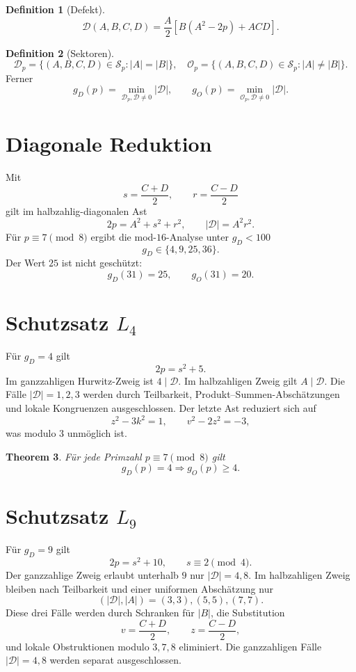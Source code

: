 \documentclass[11pt,a4paper]{article}
\newtheorem{theorem}{Theorem}[section]
\theoremstyle{definition}
\newtheorem{definition}[theorem]{Definition}
\newcommand{\Sp}{\mathcal S_p}
\newcommand{\Dp}{\mathcal D_p}
\newcommand{\Op}{\mathcal O_p}
\newcommand{\Def}{\mathscr D}
\begin{document}
\begin{definition}[Defekt]
\[
\Def(A,B,C,D)=\frac{A}{2}\left[B(A^2-2p)+ACD\right].
\]
\end{definition}

\begin{definition}[Sektoren]
\[
\Dp=\{(A,B,C,D)\in\Sp:|A|=|B|\},
\quad
\Op=\{(A,B,C,D)\in\Sp:|A|\ne|B|\}.
\]
Ferner
\[
g_D(p)=\min_{\Dp,\Def\ne0}|\Def|,
\qquad
g_O(p)=\min_{\Op,\Def\ne0}|\Def|.
\]
\end{definition}

\section{Diagonale Reduktion}
Mit
\[
s=\frac{C+D}{2},\qquad r=\frac{C-D}{2}
\]
gilt im halbzahlig-diagonalen Ast
\[
2p=A^2+s^2+r^2,
\qquad
|\Def|=A^2r^2.
\]
Für \(p\equiv7\pmod8\) ergibt die mod-\(16\)-Analyse unter \(g_D<100\)
\[
\boxed{g_D\in\{4,9,25,36\}.}
\]
Der Wert \(25\) ist nicht geschützt:
\[
g_D(31)=25,\qquad g_O(31)=20.
\]

\section{Schutzsatz \(L_4\)}
Für \(g_D=4\) gilt
\[
2p=s^2+5.
\]
Im ganzzahligen Hurwitz-Zweig ist \(4\mid\Def\). Im halbzahligen Zweig gilt \(A\mid\Def\). Die Fälle \(|\Def|=1,2,3\) werden durch Teilbarkeit, Produkt--Summen-Abschätzungen und lokale Kongruenzen ausgeschlossen. Der letzte Ast reduziert sich auf
\[
z^2-3k^2=1,\qquad v^2-2z^2=-3,
\]
was modulo \(3\) unmöglich ist.

\begin{theorem}
Für jede Primzahl \(p\equiv7\pmod8\) gilt
\[
\boxed{g_D(p)=4\Longrightarrow g_O(p)\ge4.}
\]
\end{theorem}

\section{Schutzsatz \(L_9\)}
Für \(g_D=9\) gilt
\[
2p=s^2+10,\qquad s\equiv2\pmod4.
\]
Der ganzzahlige Zweig erlaubt unterhalb \(9\) nur \(|\Def|=4,8\). Im halbzahligen Zweig bleiben nach Teilbarkeit und einer uniformen Abschätzung nur
\[
(|\Def|,|A|)=(3,3),(5,5),(7,7).
\]
Diese drei Fälle werden durch Schranken für \(|B|\), die Substitution
\[
v=\frac{C+D}{2},\qquad z=\frac{C-D}{2},
\]
und lokale Obstruktionen modulo \(3,7,8\) eliminiert. Die ganzzahligen Fälle \(|\Def|=4,8\) werden separat ausgeschlossen.
\end{document}
